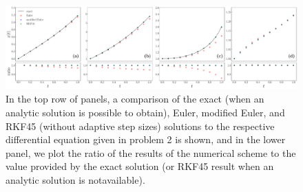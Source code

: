 \begin{figure}[h!tb]
    \centering
    \centerline{\includegraphics[width=0.9\paperwidth]{prob2.pdf}}
    \caption{In the top row of panels, a comparison of the exact (when an analytic solution is possible to obtain), Euler, modified Euler, and RKF45 (without adaptive step sizes) solutions to the respective differential equation given in problem 2 is shown, and in the lower panel, we plot the ratio of the results of the numerical scheme to the value provided by the exact solution (or RKF45 result when  an analytic solution is notavailable).}
    \label{fig:prob2}
\end{figure}



